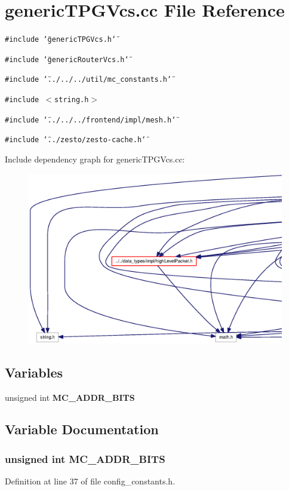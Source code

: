 \section{genericTPGVcs.cc File Reference}
\label{genericTPGVcs_8cc}
{\tt \#include \char`\"{}genericTPGVcs.h\char`\"{}}\par
{\tt \#include \char`\"{}genericRouterVcs.h\char`\"{}}\par
{\tt \#include \char`\"{}../../../util/mc\_\-constants.h\char`\"{}}\par
{\tt \#include $<$string.h$>$}\par
{\tt \#include \char`\"{}../../../frontend/impl/mesh.h\char`\"{}}\par
{\tt \#include \char`\"{}../zesto/zesto-cache.h\char`\"{}}\par


Include dependency graph for genericTPGVcs.cc:\nopagebreak
\begin{figure}[H]
\begin{center}
\leavevmode
\includegraphics[width=420pt]{genericTPGVcs_8cc__incl}
\end{center}
\end{figure}
\subsection*{Variables}
\begin{CompactItemize}
\item 
unsigned int {\bf MC\_\-ADDR\_\-BITS}
\end{CompactItemize}


\subsection{Variable Documentation}
\subsubsection[{MC\_\-ADDR\_\-BITS}]{\setlength{\rightskip}{0pt plus 5cm}unsigned int {\bf MC\_\-ADDR\_\-BITS}}\label{genericTPGVcs_8cc_5797f7fc969d8a7c02df4ba708ed734f}




Definition at line 37 of file config\_\-constants.h.